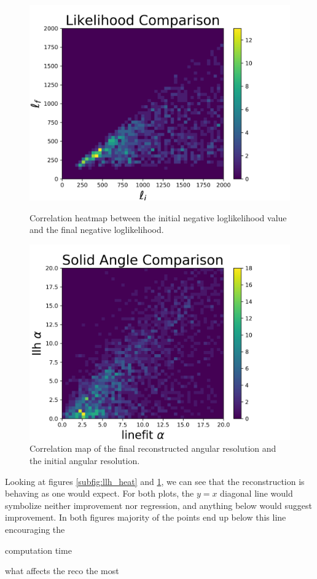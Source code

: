 \begin{figure}[ht]
  \begin{minipage}[b]{0.48\linewidth}
    \centering
    \includegraphics[width=\textwidth]{./Figures/reco_plots/llhratio_comp_heat.png}
    \caption{Correlation heatmap between the initial negative loglikelihood value and the final negative loglikelihood.}
    \label{subfig:llh_heat}
  \end{minipage}
  \hspace{0.1cm}
  \begin{minipage}[b]{0.48\linewidth}
    \centering
    \includegraphics[width=\textwidth]{./Figures/reco_plots/alpha_dist_comp_heat.png}
    \caption{Correlation map of the final reconstructed angular resolution and the initial angular resolution.}
    \label{subfig:alpha_heat}
  \end{minipage}
\end{figure}

Looking at figures \ref{subfig:llh_heat} and \ref{subfig:alpha_heat}, we can see that the reconstruction is behaving as one would expect. For both plots, the $y=x$ diagonal line would symbolize neither improvement nor regression, and anything below would suggest improvement. In both figures majority of the points end up below this line encouraging the 


computation time

what affects the reco the most


